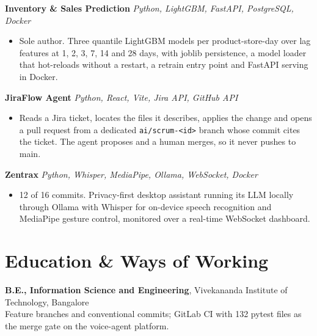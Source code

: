 \documentclass[10pt,a4paper]{article}
\begin{document}
\vspace{1pt}
\textbf{Inventory \& Sales Prediction} \textit{Python, LightGBM, FastAPI, PostgreSQL, Docker}
\begin{itemize}
  \item Sole author. Three quantile LightGBM models per product-store-day over lag features at 1, 2,
        3, 7, 14 and 28 days, with joblib persistence, a model loader that hot-reloads without a
        restart, a retrain entry point and FastAPI serving in Docker.
\end{itemize}

\vspace{1pt}
\textbf{JiraFlow Agent} \textit{Python, React, Vite, Jira API, GitHub API}
\begin{itemize}
  \item Reads a Jira ticket, locates the files it describes, applies the change and opens a pull
        request from a dedicated \texttt{ai/scrum-<id>} branch whose commit cites the ticket. The
        agent proposes and a human merges, so it never pushes to main.
\end{itemize}

\vspace{1pt}
\textbf{Zentrax} \textit{Python, Whisper, MediaPipe, Ollama, WebSocket, Docker}
\begin{itemize}
  \item 12 of 16 commits. Privacy-first desktop assistant running its LLM locally through Ollama with
        Whisper for on-device speech recognition and MediaPipe gesture control, monitored over a
        real-time WebSocket dashboard.
\end{itemize}

\section{Education \& Ways of Working}
\textbf{B.E., Information Science and Engineering}, Vivekananda Institute of Technology, Bangalore\\
Feature branches and conventional commits; GitLab CI with 132 pytest files as the merge gate on the
voice-agent platform.
\end{document}
